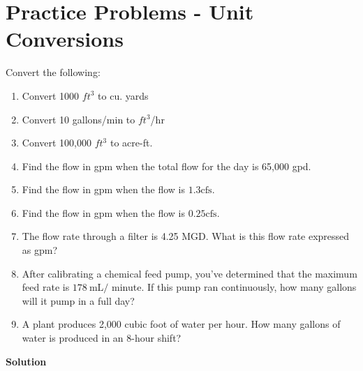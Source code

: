 \section*{Practice Problems - Unit Conversions}
Convert the following:\\
\begin{enumerate}
\item Convert 1000 $ft^3$ to cu. yards\\

\item Convert 10 gallons/min to $ft^3$/hr\\

\item Convert 100,000 $ft^3$ to acre-ft.\\

\item Find the flow in gpm when the total flow for the day is 65,000 gpd.

\item Find the flow in gpm when the flow is $1.3 \mathrm{cfs}$.

\item Find the flow in gpm when the flow is $0.25 \mathrm{cfs}$.

\item The flow rate through a filter is 4.25 MGD. What is this flow rate expressed as gpm?\\

\item After calibrating a chemical feed pump, you've determined that the maximum feed rate is $178 \mathrm{~mL} /$ minute. If this pump ran continuously, how many gallons will it pump in a full day?

\item A plant produces 2,000 cubic foot of water per hour. How many gallons of water is produced in an 8-hour shift?
\end{enumerate}
\textbf{Solution}
